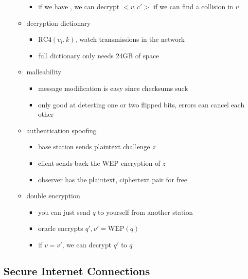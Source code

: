 \documentclass[12pt]{article}
\providecommand{\tightlist}{%
  \setlength{\itemsep}{0pt}\setlength{\parskip}{0pt}}
\begin{document}
\begin{itemize}
\begin{itemize}
    \begin{itemize}
    \tightlist
    \item
      if we have \(<v,c>\), we can decrypt \(<v, c'>\) if we can find a
      collision in \(v\)
    \end{itemize}
  \item
    decryption dictionary

    \begin{itemize}
    \tightlist
    \item
      \(\text{RC4}(v_i, k)\), watch transmissions in the network
    \item
      full dictionary only needs 24GB of space
    \end{itemize}
  \item
    malleability

    \begin{itemize}
    \tightlist
    \item
      message modification is easy since checksums suck
    \item
      only good at detecting one or two flipped bits, errors can cancel
      each other
    \end{itemize}
  \item
    authentication spoofing

    \begin{itemize}
    \tightlist
    \item
      base station sends plaintext challenge \(z\)
    \item
      client sends back the WEP encryption of \(z\)
    \item
      observer has the plaintext, ciphertext pair for free
    \end{itemize}
  \item
    double encryption

    \begin{itemize}
    \tightlist
    \item
      you can just send \(q\) to yourself from another station
    \item
      oracle encrypts \(q', v' = \text{WEP}(q)\)
    \item
      if \(v = v'\), we can decrypt \(q'\) to \(q\)
    \end{itemize}
  \end{itemize}
\end{itemize}

\hypertarget{secure-internet-connections}{%
\subsection{Secure Internet
Connections}\label{secure-internet-connections}}
\end{document}
